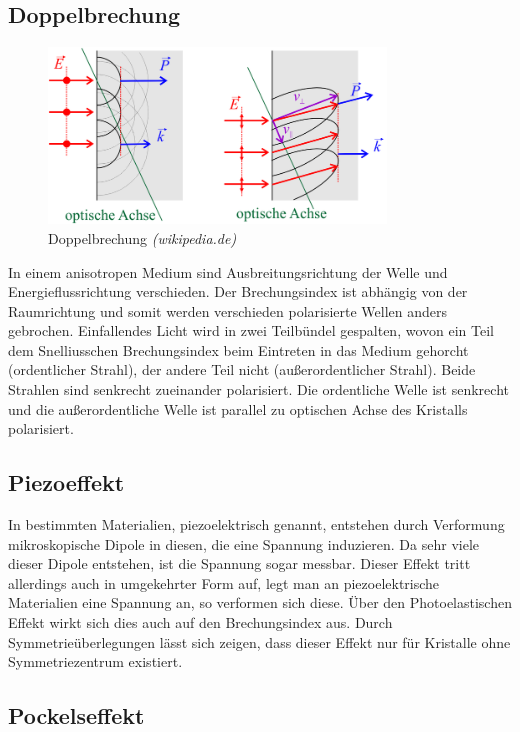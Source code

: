 \subsection{Doppelbrechung}

\begin{figure}[H]
	\centering \includegraphics[width = 0.8\textwidth]{Bilder/Doppelbrechung.jpg}
	\caption{Doppelbrechung \emph{(wikipedia.de)}}
\end{figure}

In einem anisotropen Medium sind Ausbreitungsrichtung der Welle und Energieflussrichtung verschieden. Der Brechungsindex ist abhängig von der Raumrichtung und somit werden verschieden polarisierte Wellen anders gebrochen. Einfallendes Licht wird in zwei Teilbündel gespalten, wovon ein Teil dem Snelliusschen Brechungsindex beim Eintreten in das Medium gehorcht (ordentlicher Strahl), der andere Teil nicht (außerordentlicher Strahl). Beide Strahlen sind senkrecht zueinander polarisiert. Die ordentliche Welle ist senkrecht und die außerordentliche Welle ist parallel zu optischen Achse des Kristalls polarisiert.


\subsection{Piezoeffekt}

In bestimmten Materialien, piezoelektrisch genannt, entstehen durch Verformung mikroskopische Dipole in diesen, die eine Spannung induzieren. Da sehr viele dieser Dipole entstehen, ist die Spannung sogar messbar. Dieser Effekt tritt allerdings auch in umgekehrter Form auf, legt man an piezoelektrische Materialien eine Spannung an, so verformen sich diese. Über den Photoelastischen Effekt wirkt sich dies auch auf den Brechungsindex aus. Durch Symmetrieüberlegungen lässt sich zeigen, dass dieser Effekt nur für Kristalle ohne Symmetriezentrum existiert.


\subsection{Pockelseffekt}

